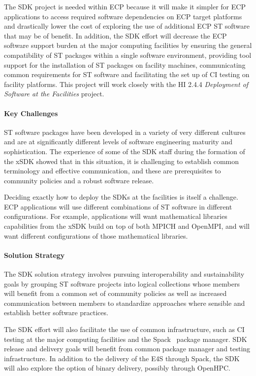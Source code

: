 The SDK project is needed within ECP because it will make it simpler for ECP applications to access required software dependencies on ECP target platforms and drastically lower the cost of exploring the use of additional ECP ST software that may be of benefit. In addition, the SDK effort will decrease the ECP software support burden at the major computing facilities by ensuring the general compatibility of ST packages within a single software environment, providing tool support for the installation of ST packages on facility machines, communicating common requirements for ST software and facilitating the set up of CI testing on facility platforms. This project will work closely with the HI 2.4.4 \textit{Deployment of Software at the Facilities} project.

\paragraph{Key  Challenges}
ST software packages have been developed in a variety of very different cultures and are at significantly different levels of software engineering maturity and sophistication. The experience of some of the SDK staff during the formation of the xSDK showed that in this situation, it is challenging to establish common terminology and effective communication, and these are prerequisites to community policies and a robust software release.

Deciding exactly how to deploy the SDKs at the facilities is itself a challenge. ECP applications will use different combinations of ST software in different configurations. For example, applications will want mathematical libraries capabilities from the xSDK build on top of both MPICH and OpenMPI, and will want different configurations of those mathematical libraries.

\paragraph{Solution Strategy}
The SDK solution strategy involves pursuing interoperability and sustainability goals by grouping ST software projects into logical collections whose members will benefit from a common set of community policies as well as increased communication between members to standardize approaches where sensible and establish better software practices. 

The SDK effort will also facilitate the use of common infrastructure, such as CI testing at the major computing facilities and the Spack~\cite{gamblin+:sc15} package manager. SDK release and delivery goals will benefit from common package manager and testing infrastructure. In addition to the delivery of the E4S through Spack, the SDK will also explore the option of binary delivery, possibly through OpenHPC.

